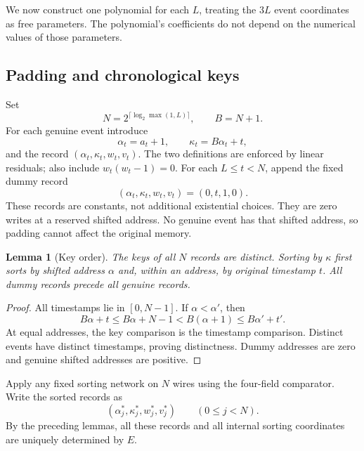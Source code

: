 \documentclass[11pt,a4paper]{article}
\newtheorem{lemma}[lemma]{Lemma}
\theoremstyle{definition}
\theoremstyle{remark}
\begin{document}
We now construct one polynomial for each $L$, treating the $3L$ event
coordinates as free parameters. The polynomial's coefficients do not depend on
the numerical values of those parameters.

\subsection{Padding and chronological keys}
Set
\begin{equation}\label{cdc:mem:eq:padding}
 N=2^{\lceil\log_2\max(1,L)\rceil},\qquad B=N+1.
\end{equation}
For each genuine event introduce
\begin{equation}\label{cdc:mem:eq:keys}
 \alpha_t=a_t+1,\qquad \kappa_t=B\alpha_t+t,
\end{equation}
and the record $(\alpha_t,\kappa_t,w_t,v_t)$. The two definitions are enforced
by linear residuals; also include $w_t(w_t-1)=0$. For each $L\leq t<N$, append
the fixed dummy record
\begin{equation}\label{cdc:mem:eq:dummy}
 (\alpha_t,\kappa_t,w_t,v_t)=(0,t,1,0).
\end{equation}
These records are constants, not additional existential choices. They are zero
writes at a reserved shifted address. No genuine event has that shifted
address, so padding cannot affect the original memory.

\begin{lemma}[Key order]\label{cdc:mem:lem:key-order}
The keys of all $N$ records are distinct. Sorting by $\kappa$ first sorts by
shifted address $\alpha$ and, within an address, by original timestamp $t$.
All dummy records precede all genuine records.
\end{lemma}
\begin{proof}
All timestamps lie in $[0,N-1]$. If $\alpha<\alpha'$, then
\[
 B\alpha+t\leq B\alpha+N-1
 <B(\alpha+1)\leq B\alpha'+t'.
\]
At equal addresses, the key comparison is the timestamp comparison. Distinct
events have distinct timestamps, proving distinctness. Dummy addresses are
zero and genuine shifted addresses are positive.
\end{proof}

Apply any fixed sorting network on $N$ wires using the four-field comparator.
Write the sorted records as
\begin{equation}
 (\alpha_j^*,\kappa_j^*,w_j^*,v_j^*)\qquad(0\leq j<N).
\end{equation}
By the preceding lemmas, all these records and all internal sorting coordinates
are uniquely determined by $E$.
\end{document}
